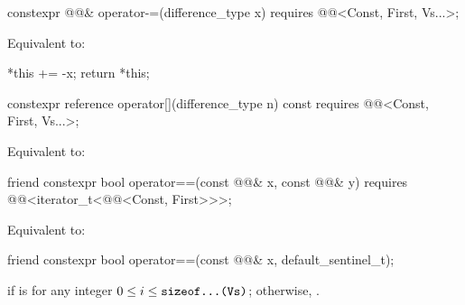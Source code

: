 %
\begin{itemdecl}
constexpr @@& operator-=(difference_type x)
  requires @@<Const, First, Vs...>;
\end{itemdecl}

\begin{itemdescr}
\pnum
\effects
Equivalent to:
\begin{codeblock}
*this += -x;
return *this;
\end{codeblock}
\end{itemdescr}

%
\begin{itemdecl}
constexpr reference operator[](difference_type n) const
  requires @@<Const, First, Vs...>;
\end{itemdecl}

\begin{itemdescr}
\pnum
\effects
Equivalent to: 
\end{itemdescr}

%
\begin{itemdecl}
friend constexpr bool operator==(const @@& x, const @@& y)
  requires @@<iterator_t<@@<Const, First>>>;
\end{itemdecl}

\begin{itemdescr}
\pnum
\effects
Equivalent to: 
\end{itemdescr}

%
\begin{itemdecl}
friend constexpr bool operator==(const @@& x, default_sentinel_t);
\end{itemdecl}

\begin{itemdescr}
\pnum
\returns
{} if 
is 
for any integer $0 \le i \le \tcode{sizeof...(Vs)}$;
otherwise, .
\end{itemdescr}

